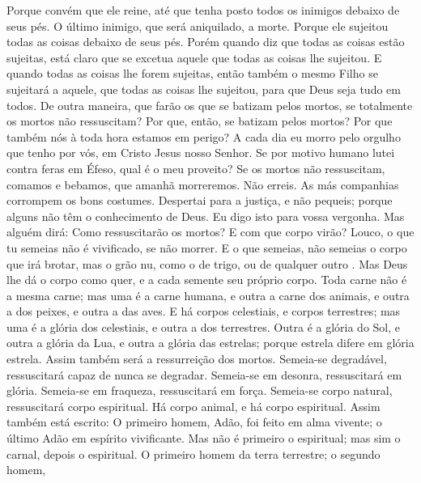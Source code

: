 {  Porque convém que ele reine, até que tenha posto todos os inimigos debaixo de seus pés.
  O último inimigo, que será aniquilado,
{} a morte.
  Porque ele sujeitou todas as coisas debaixo de seus pés. Porém quando diz que todas as coisas
{} estão sujeitas, está claro que se excetua aquele que todas as coisas lhe sujeitou.
  E quando todas as coisas lhe forem sujeitas, então também o mesmo Filho se sujeitará a aquele, que todas as coisas lhe sujeitou, para que Deus seja tudo em todos.
  De outra maneira, que farão os que se batizam pelos mortos, se totalmente os mortos não ressuscitam? Por que, então, se batizam pelos mortos?
  Por que também nós à toda hora estamos em perigo?
  A cada dia eu morro pelo orgulho que tenho por vós, em Cristo Jesus nosso Senhor.
  Se por motivo humano lutei contra feras em Éfeso, qual é o meu proveito? Se os mortos não ressuscitam, comamos e bebamos, que amanhã morreremos.
  Não erreis. As más companhias corrompem os bons costumes.
  Despertai para a justiça, e não pequeis; porque alguns
{} não têm o conhecimento de Deus. Eu digo isto para vossa vergonha.
  Mas alguém dirá: Como ressuscitarão os mortos? E com que corpo virão?
  Louco, o que tu semeias não é vivificado, se
{} não morrer.
  E o que semeias, não semeias o corpo que irá brotar, mas o grão nu, como o de trigo, ou de qualquer outro
{} .
  Mas Deus lhe dá o corpo como quer, e a cada semente seu próprio corpo.
  Toda carne não é a mesma carne; mas uma é a carne humana, e outra a carne dos animais, e outra a dos peixes, e outra a das aves.
  E há corpos celestiais, e corpos terrestres; mas uma é a glória dos celestiais, e outra a dos terrestres.
  Outra é a glória do Sol, e outra a glória da Lua, e outra a glória das estrelas; porque
{} estrela difere em glória
{} estrela.
  Assim também será a ressurreição dos mortos. Semeia-se
{} degradável, ressuscitará capaz de nunca se degradar.
  Semeia-se em desonra, ressuscitará em glória. Semeia-se em fraqueza, ressuscitará em força.
  Semeia-se corpo natural, ressuscitará corpo espiritual. Há corpo animal, e há corpo espiritual.
  Assim também está escrito: O primeiro homem, Adão, foi feito em alma vivente; o último Adão em espírito vivificante.
  Mas não é primeiro o espiritual; mas sim o carnal, depois o espiritual.
  O primeiro homem da terra
{} terrestre; o segundo homem,
}
